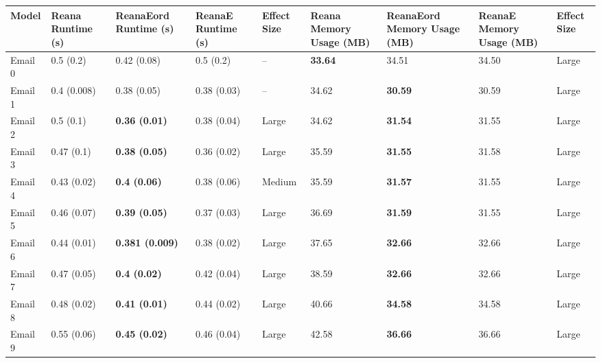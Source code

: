 \begin{tabular}{lllllllll}
\toprule
   Model & Reana Runtime (s) &  ReanaEord Runtime (s) & ReanaE Runtime (s) & Effect Size & Reana Memory Usage (MB) & ReanaEord Memory Usage (MB) & ReanaE Memory Usage (MB) & Effect Size \\
\midrule
 Email 0 &         0.5 (0.2) &            0.42 (0.08) &          0.5 (0.2) &          -- &          \textbf{33.64} &                       34.51 &                    34.50 &       Large \\
 Email 1 &       0.4 (0.008) &            0.38 (0.05) &        0.38 (0.03) &          -- &                   34.62 &              \textbf{30.59} &                    30.59 &       Large \\
 Email 2 &         0.5 (0.1) &   \textbf{0.36 (0.01)} &        0.38 (0.04) &       Large &                   34.62 &              \textbf{31.54} &                    31.55 &       Large \\
 Email 3 &        0.47 (0.1) &   \textbf{0.38 (0.05)} &        0.36 (0.02) &       Large &                   35.59 &              \textbf{31.55} &                    31.58 &       Large \\
 Email 4 &       0.43 (0.02) &    \textbf{0.4 (0.06)} &        0.38 (0.06) &      Medium &                   35.59 &              \textbf{31.57} &                    31.55 &       Large \\
 Email 5 &       0.46 (0.07) &   \textbf{0.39 (0.05)} &        0.37 (0.03) &       Large &                   36.69 &              \textbf{31.59} &                    31.55 &       Large \\
 Email 6 &       0.44 (0.01) & \textbf{0.381 (0.009)} &        0.38 (0.02) &       Large &                   37.65 &              \textbf{32.66} &                    32.66 &       Large \\
 Email 7 &       0.47 (0.05) &    \textbf{0.4 (0.02)} &        0.42 (0.04) &       Large &                   38.59 &              \textbf{32.66} &                    32.66 &       Large \\
 Email 8 &       0.48 (0.02) &   \textbf{0.41 (0.01)} &        0.44 (0.02) &       Large &                   40.66 &              \textbf{34.58} &                    34.58 &       Large \\
 Email 9 &       0.55 (0.06) &   \textbf{0.45 (0.02)} &        0.46 (0.04) &       Large &                   42.58 &              \textbf{36.66} &                    36.66 &       Large \\

\end{tabular}
